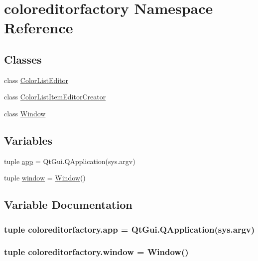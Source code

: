 \hypertarget{namespacecoloreditorfactory}{}\section{coloreditorfactory Namespace Reference}
\label{namespacecoloreditorfactory}
\subsection*{Classes}
\begin{DoxyCompactItemize}
\item 
class \hyperlink{classcoloreditorfactory_1_1ColorListEditor}{Color\+List\+Editor}
\item 
class \hyperlink{classcoloreditorfactory_1_1ColorListItemEditorCreator}{Color\+List\+Item\+Editor\+Creator}
\item 
class \hyperlink{classcoloreditorfactory_1_1Window}{Window}
\end{DoxyCompactItemize}
\subsection*{Variables}
\begin{DoxyCompactItemize}
\item 
tuple \hyperlink{namespacecoloreditorfactory_a763695c1c700f45c7cc01c3f47283e33}{app} = Qt\+Gui.\+Q\+Application(sys.\+argv)
\item 
tuple \hyperlink{namespacecoloreditorfactory_a6d03f82e62f5ee4c0bbb8c9f59dfc8f8}{window} = \hyperlink{classcoloreditorfactory_1_1Window}{Window}()
\end{DoxyCompactItemize}


\subsection{Variable Documentation}
\hypertarget{namespacecoloreditorfactory_a763695c1c700f45c7cc01c3f47283e33}{}
\subsubsection[{app}]{\setlength{\rightskip}{0pt plus 5cm}tuple coloreditorfactory.\+app = Qt\+Gui.\+Q\+Application(sys.\+argv)}\label{namespacecoloreditorfactory_a763695c1c700f45c7cc01c3f47283e33}
\hypertarget{namespacecoloreditorfactory_a6d03f82e62f5ee4c0bbb8c9f59dfc8f8}{}
\subsubsection[{window}]{\setlength{\rightskip}{0pt plus 5cm}tuple coloreditorfactory.\+window = {\bf Window}()}\label{namespacecoloreditorfactory_a6d03f82e62f5ee4c0bbb8c9f59dfc8f8}
